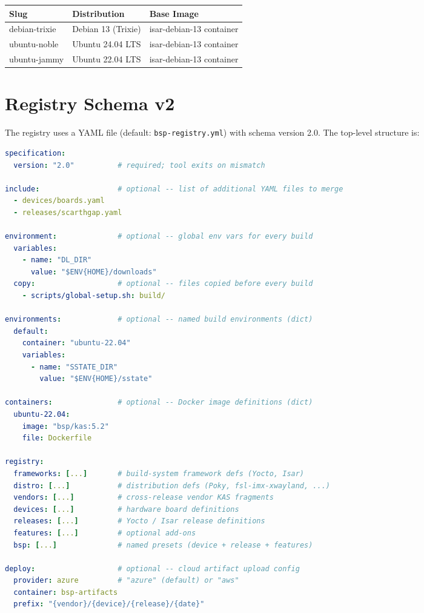 \documentclass[a4paper,11pt]{article}
\begin{document}
\begin{tabularx}{\linewidth}{L{36mm}L{50mm}X}
  \textbf{Slug} & \textbf{Distribution} & \textbf{Base Image} \\
  \toprule
   debian-trixie & Debian 13 (Trixie) & isar-debian-13 container \\
    ubuntu-noble  & Ubuntu 24.04 LTS   & isar-debian-13 container \\
   ubuntu-jammy  & Ubuntu 22.04 LTS   & isar-debian-13 container \\
  \bottomrule
\end{tabularx}

\section{Registry Schema v2}
\label{sec:registry}

The registry uses a YAML file (default: \texttt{bsp-registry.yml}) with schema
version 2.0. The top-level structure is:

\begin{lstlisting}[language=YAML]
specification:
  version: "2.0"          # required; tool exits on mismatch

include:                  # optional -- list of additional YAML files to merge
  - devices/boards.yaml
  - releases/scarthgap.yaml

environment:              # optional -- global env vars for every build
  variables:
    - name: "DL_DIR"
      value: "$ENV{HOME}/downloads"
  copy:                   # optional -- files copied before every build
    - scripts/global-setup.sh: build/

environments:             # optional -- named build environments (dict)
  default:
    container: "ubuntu-22.04"
    variables:
      - name: "SSTATE_DIR"
        value: "$ENV{HOME}/sstate"

containers:               # optional -- Docker image definitions (dict)
  ubuntu-22.04:
    image: "bsp/kas:5.2"
    file: Dockerfile

registry:
  frameworks: [...]       # build-system framework defs (Yocto, Isar)
  distro: [...]           # distribution defs (Poky, fsl-imx-xwayland, ...)
  vendors: [...]          # cross-release vendor KAS fragments
  devices: [...]          # hardware board definitions
  releases: [...]         # Yocto / Isar release definitions
  features: [...]         # optional add-ons
  bsp: [...]              # named presets (device + release + features)

deploy:                   # optional -- cloud artifact upload config
  provider: azure         # "azure" (default) or "aws"
  container: bsp-artifacts
  prefix: "{vendor}/{device}/{release}/{date}"
\end{lstlisting}
\end{document}
